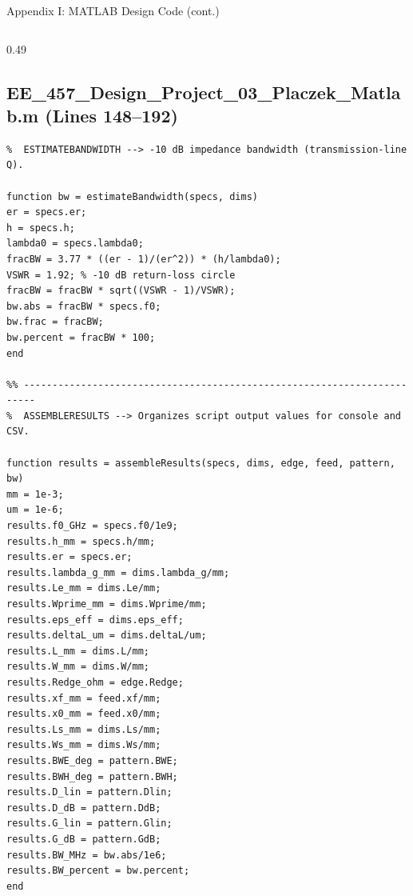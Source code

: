 \documentclass[compress,aspectratio=169,10pt]{beamer}
\begin{document}
\begin{frame}[fragile]{Appendix I: MATLAB Design Code (cont.)}
\begin{columns}[T]
\begin{column}{0.49\textwidth}
\subsection[Design code 4]{EE\_457\_Design\_Project\_03\_Placzek\_Matlab.m (Lines 148--192)}
            \begin{lstlisting}[firstnumber=148]
%% ------------------------------------------------------------------------
%  ESTIMATEBANDWIDTH --> -10 dB impedance bandwidth (transmission-line Q).

function bw = estimateBandwidth(specs, dims)
er = specs.er;
h = specs.h;
lambda0 = specs.lambda0;
fracBW = 3.77 * ((er - 1)/(er^2)) * (h/lambda0);
VSWR = 1.92; % -10 dB return-loss circle
fracBW = fracBW * sqrt((VSWR - 1)/VSWR);
bw.abs = fracBW * specs.f0;
bw.frac = fracBW;
bw.percent = fracBW * 100;
end

%% ------------------------------------------------------------------------
%  ASSEMBLERESULTS --> Organizes script output values for console and CSV.

function results = assembleResults(specs, dims, edge, feed, pattern, bw)
mm = 1e-3;
um = 1e-6;
results.f0_GHz = specs.f0/1e9;
results.h_mm = specs.h/mm;
results.er = specs.er;
results.lambda_g_mm = dims.lambda_g/mm;
results.Le_mm = dims.Le/mm;
results.Wprime_mm = dims.Wprime/mm;
results.eps_eff = dims.eps_eff;
results.deltaL_um = dims.deltaL/um;
results.L_mm = dims.L/mm;
results.W_mm = dims.W/mm;
results.Redge_ohm = edge.Redge;
results.xf_mm = feed.xf/mm;
results.x0_mm = feed.x0/mm;
results.Ls_mm = dims.Ls/mm;
results.Ws_mm = dims.Ws/mm;
results.BWE_deg = pattern.BWE;
results.BWH_deg = pattern.BWH;
results.D_lin = pattern.Dlin;
results.D_dB = pattern.DdB;
results.G_lin = pattern.Glin;
results.G_dB = pattern.GdB;
results.BW_MHz = bw.abs/1e6;
results.BW_percent = bw.percent;
end
            \end{lstlisting}
        \end{column}
    \end{columns}
\end{frame}
\end{document}

